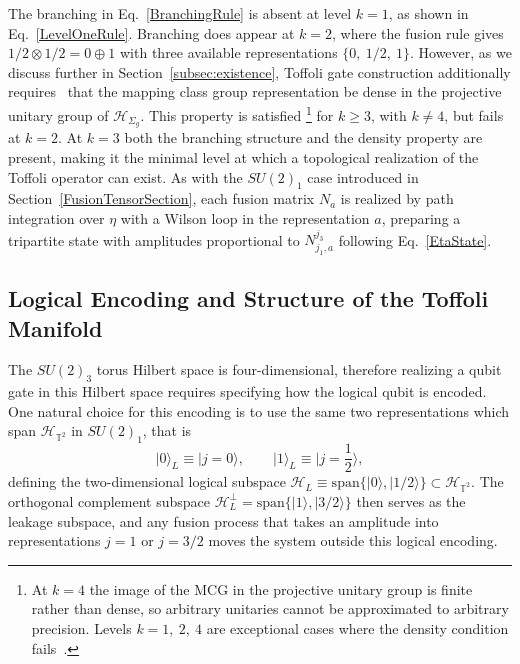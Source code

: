 \documentclass[12pt,a4paper]{article}
\def\ket#1{{|{#1}\rangle}}
\begin{document}
The branching in Eq.\ \eqref{BranchingRule} is absent at level $k = 1$, as shown in Eq.\ \eqref{LevelOneRule}. Branching does appear at $k = 2$, where the fusion rule gives $1/2 \otimes 1/2 = 0 \oplus 1$ with three available representations $\{0,\ 1/2,\ 1\}$. However, as we discuss further in Section~\ref{subsec:existence}, Toffoli gate construction additionally requires~\cite{Freedman2003} that the mapping class group representation be dense in the projective unitary group of $\mathcal{H}_{\Sigma_g}$. This property is satisfied%
%
\footnote{At $k = 4$ the image of the MCG in the projective unitary group is finite rather than dense, so arbitrary unitaries cannot be approximated to arbitrary precision. Levels $k = 1,\ 2,\ 4$ are exceptional cases where the density condition fails~\cite{Freedman2003}.} %
% 
for $k \geq 3$, with $k \neq 4$, but fails at $k = 2$. At $k = 3$ both the branching structure and the density property are present, making it the minimal level at which a topological realization of the Toffoli operator can exist. As with the $SU(2)_1$ case introduced in Section~\ref{FusionTensorSection}, each fusion matrix $N_a$ is realized by path integration over $\eta$ with a Wilson loop in the representation $a$, preparing a tripartite state with amplitudes proportional to $N^{j_3}_{j_1, a}$ following Eq.\ \eqref{EtaState}.

\subsection{Logical Encoding and Structure of the Toffoli Manifold}\label{subsec:encoding}

The $SU(2)_3$ torus Hilbert space is four-dimensional, therefore realizing a qubit gate in this Hilbert space requires specifying how the logical qubit is encoded. One natural choice for this encoding is to use the same two representations which span $\mathcal{H}_{\mathbb{T}^2}$ in $SU(2)_1$, that is
%
\begin{equation}\label{LogicalEncoding}
\ket{0}_L \equiv \ket{j=0}, \qquad \ket{1}_L \equiv \ket{j=\frac{1}{2}},
\end{equation}
%
defining the two-dimensional logical subspace $\mathcal{H}_L \equiv \mathrm{span}\{\ket{0}, \ket{1/2}\} \subset \mathcal{H}_{\mathbb{T}^2}$. The orthogonal complement subspace $\mathcal{H}_L^\perp = \mathrm{span}\{\ket{1},\ket{3/2}\}$ then serves as the leakage subspace, and any fusion process that takes an amplitude into representations $j = 1$ or $j = 3/2$ moves the system outside this logical encoding.
\end{document}
